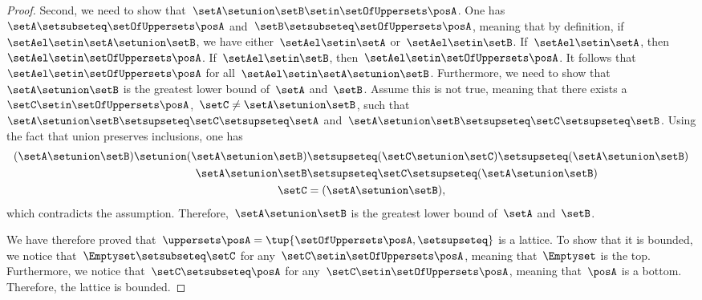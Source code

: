\begin{proof}
        Second, we need to show that~$\setA\setunion \setB\setin \setOfUppersets \posA$.
        One has~$\setA\setsubseteq \setOfUppersets \posA$ and~$\setB \setsubseteq \setOfUppersets \posA$, meaning that by definition, if~$\setAel\setin \setA\setunion \setB$, we have either~$\setAel\setin \setA$ or~$\setAel\setin \setB$.
        If~$\setAel\setin \setA$, then~$\setAel\setin \setOfUppersets \posA$.
        If~$\setAel\setin \setB$, then~$\setAel \setin \setOfUppersets \posA$.
        It follows that~$\setAel \setin \setOfUppersets \posA$ for all~$\setAel\setin \setA\setunion \setB$.
        Furthermore, we need to show that~$\setA\setunion \setB$ is the greatest lower bound of~$\setA$ and~$\setB$.
        Assume this is not true, meaning that there exists a~$\setC\setin \setOfUppersets \posA$,~$\setC\neq \setA\setunion \setB$, such that~$\setA\setunion \setB\setsupseteq \setC\setsupseteq \setA$ and~$\setA\setunion \setB\setsupseteq \setC\setsupseteq \setB$.
        Using the fact that union preserves inclusions, one has
        \begin{equation}
            \begin{aligned}
                (\setA\setunion \setB)
                \setunion (\setA\setunion \setB) & \setsupseteq (\setC \setunion \setC) \setsupseteq (\setA\setunion \setB) \\
                \setA\setunion \setB             & \setsupseteq \setC\setsupseteq (\setA\setunion \setB ) \\
                \setC                            & =(\setA\setunion \setB),
            \end{aligned}
        \end{equation}
        which contradicts the assumption.
        Therefore,~$\setA\setunion \setB$ is the greatest lower bound of~$\setA$ and~$\setB$.

        We have therefore proved that~$\uppersets \posA=\tup{\setOfUppersets \posA,\setsupseteq}$ is a lattice.
        To show that it is bounded, we notice that~$\Emptyset \setsubseteq \setC$ for any~$\setC\setin \setOfUppersets \posA$, meaning that~$\Emptyset$ is the top.
        Furthermore, we notice that~$\setC\setsubseteq \posA$ for any~$\setC\setin \setOfUppersets \posA$, meaning that~$\posA$ is a bottom.
    Therefore, the lattice is bounded.
\end{proof}

